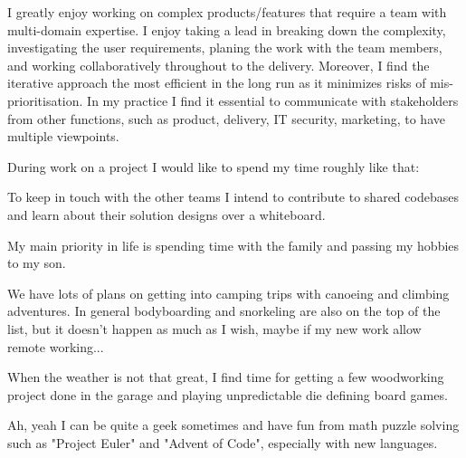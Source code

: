 \documentclass[10pt,a4paper,ragged2e,withhyper]{altacv}
\begin{document}

I greatly enjoy working on complex products/features that require a team with multi-domain
expertise.
I enjoy taking a lead in breaking down the complexity, investigating the user requirements,
planing the work with the team members, and working collaboratively throughout to the delivery.
Moreover, I find the iterative approach the most efficient in the long run as it minimizes
risks of mis-prioritisation.
In my practice I find it essential to communicate with stakeholders from other functions, such as
product, delivery, IT security, marketing, to have multiple viewpoints.

\vspace{1px}

During work on a project I would like to spend my time roughly like that:


\vspace{1px}

To keep in touch with the other teams I intend to contribute to shared codebases and
learn about their solution designs over a whiteboard.


My main priority in life is spending time with the family and passing my hobbies to my son.

We have lots of plans on getting into camping trips with canoeing and climbing adventures.
In general bodyboarding and snorkeling are also on the top of the list, but it doesn't
happen as much as I wish, maybe if my new work allow remote working...

When the weather is not that great, I find time for getting a few woodworking project done
in the garage and playing unpredictable die defining board games.

Ah, yeah I can be quite a geek sometimes and have fun from math puzzle solving such as
"Project Euler" and "Advent of Code", especially with new languages.

\end{document}
